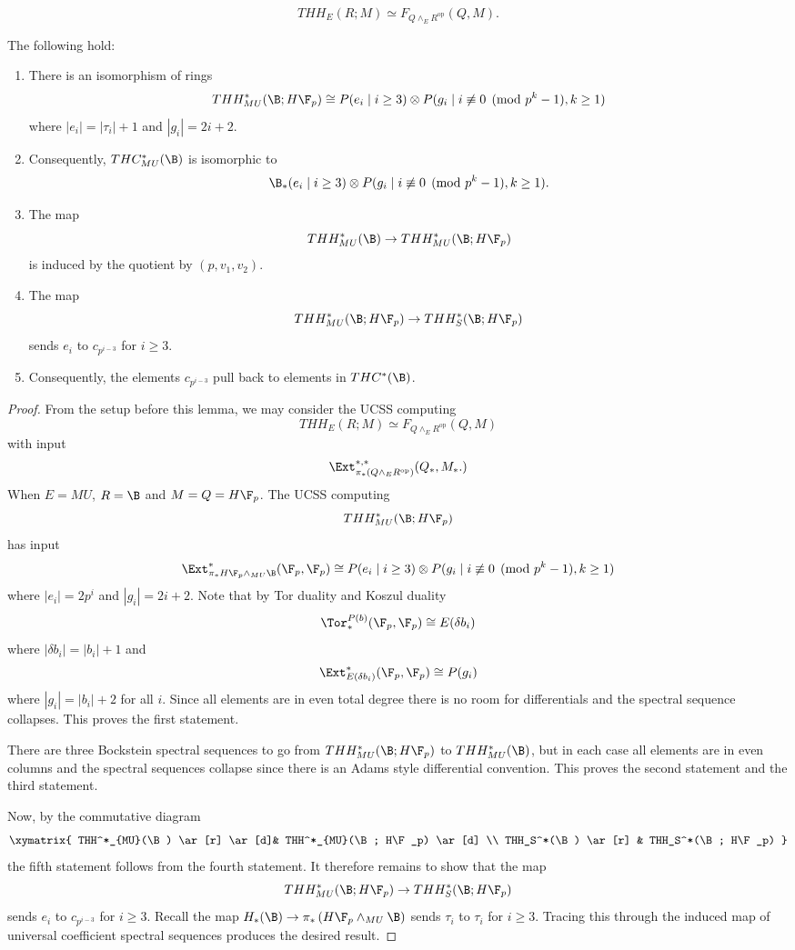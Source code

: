 \[ THH_E(R;M)\simeq F_{Q\wedge_E R^{\text{op}}} (Q,M). \]
\begin{lem} The following hold:
\begin{enumerate}
\item There is an isomorphism of rings 
\[ THH_{MU}^*(\B;H\F_p)\cong P(e_i \mid i\ge 3 )\otimes P(g_i \mid i\not \equiv 0 \pmod{p^k-1}, k\ge 1)\]
where $|e_i|=|\tau_i|+1$ and $|g_i|=2i+2$.
\item Consequently, $THC_{MU}^*(\B)$ is isomorphic to 
\[ \B_*(e_i \mid i\ge 3 )\otimes P(g_i \mid i\not \equiv 0 \pmod{p^k-1}, k\ge 1).\]
\item The map 
\[ THH_{MU}^*(\B) \to THH_{MU}^*(\B;H\F_p)\]
is induced by the quotient by $(p,v_1,v_2)$. 
\item The map 
\[ THH_{MU}^*(\B;H\F_p) \to THH_S^*(\B;H\F_p) \]
sends $e_i$ to $c_{p^{i-3}}$ for $i\ge 3$. 
\item Consequently, the elements 
$c_{p^{i-3}}$ pull back to elements in $THC^*(\B)$.
\end{enumerate}
\end{lem}
\begin{proof}
From the setup before this lemma, we may consider the UCSS computing 
\[ THH_E(R;M)\simeq F_{Q\wedge_E R^{\text{op}}} (Q,M)\]
with input 
\[ \Ext_{\pi_*(Q\wedge_E R^{\text{op}})}^{*,*}(Q_*,M_*. )\]
When $E=MU$, $R=\B$ and $M=Q=H\F_p$. The UCSS computing 
\[THH_{MU}^*(\B;H\F_p)\]
has input 
\[ \Ext_{\pi_*H\F_p\wedge_{MU}\B }^* (\F_p, \F_p)\cong P(e_i \mid i\ge 3 )\otimes P(g_i \mid i\not \equiv 0 \pmod{p^k-1}, k\ge 1) \]
where $|e_i|=2p^i$ and $|g_i|=2i+2$.
Note that by Tor duality and Koszul duality 
\[\Tor_*^{P(b)}(\F_p,\F_p)\cong E(\delta b_i)\] 
where $|\delta b_i|=|b_i|+1$ and 
\[\Ext^*_{E(\delta b_i)}(\F_p,\F_p)\cong P(g_i)\] where $|g_i|=|b_i|+2$ for all $i$. Since all elements are in even total degree there is no room for differentials and the spectral sequence  collapses. This proves the first statement. 

There are three Bockstein spectral sequences to go from $THH_{MU}^*(\B;H\F_p)$ to $THH_{MU}^*(\B)$, but in each case all elements are in even columns and the spectral sequences collapse since there is an Adams style differential convention. This proves the second statement and the third statement. 

Now, by the commutative diagram
\[
\xymatrix{
THH^*_{MU}(\B) \ar[r] \ar[d]& THH^*_{MU}(\B; H\F_p) \ar[d]  \\
THH_S^*(\B) \ar[r] & THH_S^*(\B; H\F_p) }
\]
the fifth statement follows from the fourth statement. It therefore remains to show that the map 
\[ THH_{MU}^*(\B;H\F_p) \to THH_S^*(\B;H\F_p) \]
sends $e_i$ to $c_{p^{i-3}}$ for $i\ge 3$. Recall the map  $H_*(\B) \to \pi_*\left ( H\F_p\wedge_{MU}\B \right )$ sends $\tau_i$ to $\tau_i$ for $i\ge  3$. Tracing this through the induced map of universal coefficient spectral sequences produces the desired result. 
\end{proof}
